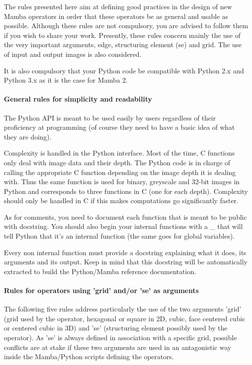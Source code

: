 \documentclass[a4paper,10pt,oneside]{article}
\begin{document}
The rules presented here aim at defining good practices in the design of new 
Mamba operators in order that these operators be as general and usable as 
possible. Although these rules are not compulsory, you are advised to follow 
them if you wish to share your work. Presently, these rules concern mainly the
use of the very important arguments, edge, structuring element (se) and grid.
The use of input and output images is also considered.

It is also compulsory that your Python code be compatible with Python 2.x and
Python 3.x as it is the case for Mamba 2.

\paragraph{General rules for simplicity and readability}

The Python API is meant to be used easily by users regardless of their
proficiency at programming (of course they need to have a basic idea of what
they are doing).

Complexity is handled in the Python interface. Most of the time, C functions
only deal with image data and their depth. The Python code is in charge of 
calling the appropriate C function depending on the image depth it is 
dealing with. Thus the same function is used for binary, greyscale and 32-bit
images in Python and corresponds to three functions in C (one for
each depth). Complexity should only be handled in C if this makes
computations go significantly faster.

As for comments, you need to document each function that is meant
to be public with docstring. You should also begin your internal functions
with a \textquotedbl{}\_\textquotedbl{} that will tell Python that
it's an internal function (the same goes for global variables).

Every non internal function must provide a docstring explaining what it does,
its arguments and its output. Keep in mind that this docstring will be
automatically extracted to build the Python/Mamba reference documentation.

\paragraph{Rules for operators using 'grid' and/or 'se' as arguments}

The following five rules address particularly the use of the two arguments 'grid'
(grid used by the operator, hexagonal or square in 2D, cubic, face centered cubic or
centered cubic in 3D) and 'se' (structuring element
possibly used by the operator). As 'se' is always defined in association with a
specific grid, possible conflicts are at stake if these two arguments are used
in an antagonistic way inside the Mamba/Python scripts defining the operators.\par
\end{document}
